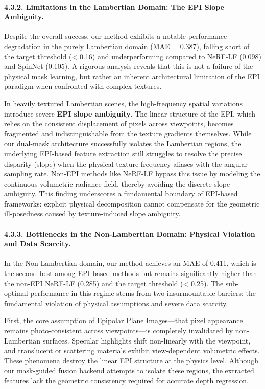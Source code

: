 \paragraph{4.3.2. Limitations in the Lambertian Domain: The EPI Slope Ambiguity.}
Despite the overall success, our method exhibits a notable performance degradation in the purely Lambertian domain (MAE = 0.387), falling short of the target threshold (< 0.16) and underperforming compared to NeRF-LF (0.098) and SpinNet (0.105). A rigorous analysis reveals that this is not a failure of the physical mask learning, but rather an inherent architectural limitation of the EPI paradigm when confronted with complex textures.

In heavily textured Lambertian scenes, the high-frequency spatial variations introduce severe \textbf{EPI slope ambiguity}. The linear structure of the EPI, which relies on the consistent displacement of pixels across viewpoints, becomes fragmented and indistinguishable from the texture gradients themselves. While our dual-mask architecture successfully isolates the Lambertian regions, the underlying EPI-based feature extraction still struggles to resolve the precise disparity (slope) when the physical texture frequency aliases with the angular sampling rate. Non-EPI methods like NeRF-LF bypass this issue by modeling the continuous volumetric radiance field, thereby avoiding the discrete slope ambiguity. This finding underscores a fundamental boundary of EPI-based frameworks: explicit physical decomposition cannot compensate for the geometric ill-posedness caused by texture-induced slope ambiguity.

\paragraph{4.3.3. Bottlenecks in the Non-Lambertian Domain: Physical Violation and Data Scarcity.}
In the Non-Lambertian domain, our method achieves an MAE of 0.411, which is the second-best among EPI-based methods but remains significantly higher than the non-EPI NeRF-LF (0.285) and the target threshold (< 0.25). The sub-optimal performance in this regime stems from two insurmountable barriers: the fundamental violation of physical assumptions and severe data scarcity.

First, the core assumption of Epipolar Plane Images—that pixel appearance remains photo-consistent across viewpoints—is completely invalidated by non-Lambertian surfaces. Specular highlights shift non-linearly with the viewpoint, and translucent or scattering materials exhibit view-dependent volumetric effects. These phenomena destroy the linear EPI structure at the physics level. Although our mask-guided fusion backend attempts to isolate these regions, the extracted features lack the geometric consistency required for accurate depth regression. 

